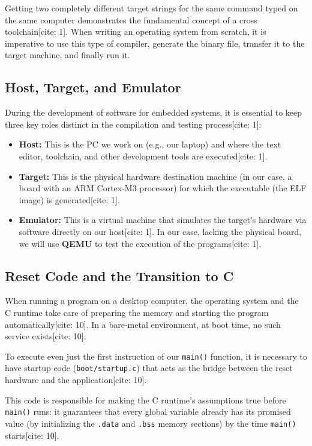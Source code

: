 Getting two completely different target strings for the same command typed on the same computer demonstrates the fundamental concept of a cross toolchain[cite: 1]. When writing an operating system from scratch, it is imperative to use this type of compiler, generate the binary file, transfer it to the target machine, and finally run it.


\subsection{Host, Target, and Emulator}
During the development of software for embedded systems, it is essential to keep three key roles distinct in the compilation and testing process[cite: 1]:
\begin{itemize}
    \item \textbf{Host:} This is the PC we work on (e.g., our laptop) and where the text editor, toolchain, and other development tools are executed[cite: 1].
    \item \textbf{Target:} This is the physical hardware destination machine (in our case, a board with an ARM Cortex-M3 processor) for which the executable (the ELF image) is generated[cite: 1].
    \item \textbf{Emulator:} This is a virtual machine that simulates the target's hardware via software directly on our host[cite: 1]. In our case, lacking the physical board, we will use \textbf{QEMU} to test the execution of the programs[cite: 1].
\end{itemize}

\subsection{Reset Code and the Transition to C}
When running a program on a desktop computer, the operating system and the C runtime take care of preparing the memory and starting the program automatically[cite: 10]. In a bare-metal environment, at boot time, no such service exists[cite: 10]. 

To execute even just the first instruction of our \texttt{main()} function, it is necessary to have startup code (\texttt{boot/startup.c}) that acts as the bridge between the reset hardware and the application[cite: 10]. 

This code is responsible for making the C runtime's assumptions true before \texttt{main()} runs: it guarantees that every global variable already has its promised value (by initializing the \texttt{.data} and \texttt{.bss} memory sections) by the time \texttt{main()} starts[cite: 10].

